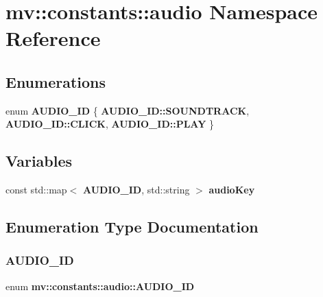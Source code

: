\section{mv\+:\+:constants\+:\+:audio Namespace Reference}
\label{namespacemv_1_1constants_1_1audio}
\subsection*{Enumerations}
\begin{DoxyCompactItemize}
\item 
enum \textbf{ A\+U\+D\+I\+O\+\_\+\+ID} \{ \textbf{ A\+U\+D\+I\+O\+\_\+\+I\+D\+::\+S\+O\+U\+N\+D\+T\+R\+A\+CK}, 
\textbf{ A\+U\+D\+I\+O\+\_\+\+I\+D\+::\+C\+L\+I\+CK}, 
\textbf{ A\+U\+D\+I\+O\+\_\+\+I\+D\+::\+P\+L\+AY}
 \}
\end{DoxyCompactItemize}
\subsection*{Variables}
\begin{DoxyCompactItemize}
\item 
const std\+::map$<$ \textbf{ A\+U\+D\+I\+O\+\_\+\+ID}, std\+::string $>$ \textbf{ audio\+Key}
\end{DoxyCompactItemize}


\subsection{Enumeration Type Documentation}
\mbox{\label{namespacemv_1_1constants_1_1audio_a4c03ea193b50a336d364663492c51f36}} 
\subsubsection{A\+U\+D\+I\+O\+\_\+\+ID}
{\footnotesize\ttfamily enum \textbf{ mv\+::constants\+::audio\+::\+A\+U\+D\+I\+O\+\_\+\+ID}\hspace{0.3cm}{\ttfamily [strong]}}


